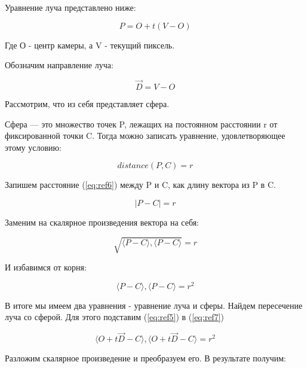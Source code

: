 Уравнение луча представлено ниже:

\begin{equation}
	P = O + t(V - O)
	\label{eq:ref5}
\end{equation}

Где О - центр камеры, а V - текущий пиксель.

Обозначим направление луча:

\begin{equation}
	\overrightarrow{D} = V - O
\end{equation}

Рассмотрим, что из себя представляет сфера.


 Сфера — это множество точек P, лежащих на постоянном расстоянии r от фиксированной точки C. Тогда можно записать уравнение, удовлетворяющее этому условию:
 
\begin{equation}
distance(P,C) = r
\label{eq:ref6}
\end{equation}

Запишем расстояние (\ref{eq:ref6}) между P и C, как длину вектора из P в C.

\begin{equation}
|P-C|=r
\end{equation}

Заменим на скалярное произведения вектора на себя:

\begin{equation}
\sqrt{\langle P - C\rangle, \langle P - C\rangle} = r
\end{equation}

И избавимся от корня:

\begin{equation}
\langle P - C\rangle, \langle P - C\rangle = r^2
\label{eq:ref7}
\end{equation}

В итоге мы имеем два уравнения - уравнение луча и сферы. Найдем пересечение луча со сферой. Для этого подставим (\ref{eq:ref5}) в (\ref{eq:ref7})

\begin{equation}
\langle O + t\overrightarrow{D} - C \rangle, \langle O + t\overrightarrow{D} - C\rangle = r^2
\end{equation}

Разложим скалярное произведение и преобразуем его. В результате получим: 

